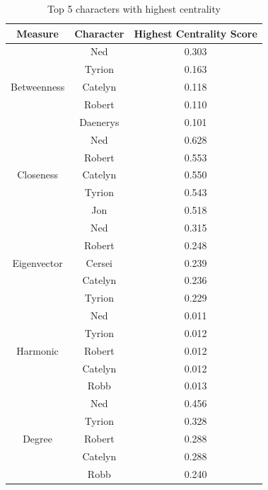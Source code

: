 \documentclass[10pt,twocolumn,letterpaper]{article}
\begin{document}
\begin{table}[]
    \centering
    \small
    \begin{tabular}{c|c|c}
        Measure & Character & \small{Highest Centrality Score}  \\
        \hline
                    & Ned & 0.303 \\
                    & Tyrion & 0.163 \\
        Betweenness & Catelyn & 0.118 \\
                    & Robert & 0.110 \\
                    & Daenerys & 0.101 \\
        \hline 
                    & Ned & 0.628 \\
                    & Robert & 0.553 \\
        Closeness   & Catelyn & 0.550 \\
                    & Tyrion & 0.543 \\
                    & Jon & 0.518 \\
        \hline 
                    & Ned & 0.315 \\
                    & Robert & 0.248 \\
        Eigenvector & Cersei & 0.239 \\
                    & Catelyn & 0.236 \\
                    & Tyrion & 0.229 \\
        \hline 
                    & Ned & 0.011 \\
                    & Tyrion & 0.012 \\
        Harmonic    & Robert & 0.012 \\
                    & Catelyn & 0.012 \\
                    & Robb & 0.013 \\
        \hline            
                    & Ned & 0.456 \\
                    & Tyrion & 0.328 \\
        Degree      & Robert & 0.288 \\
                    & Catelyn & 0.288 \\
                    & Robb & 0.240 \\
        \hline
    \end{tabular} \\
    \caption{Top 5 characters with highest centrality}
    \label{tab:my_label}
\end{table} \\
\end{document}
